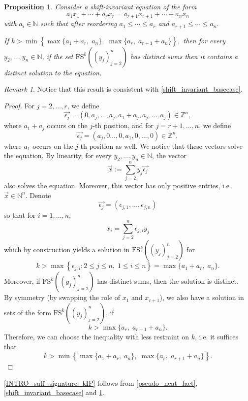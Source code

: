 \documentclass{article}
\theoremstyle{definition}
\theoremstyle{plain}
\newtheorem{proposition}[theorem]{Proposition}
\theoremstyle{remark}
\newtheorem{remark}{Remark}[section]
\newcommand{\N}{\ensuremath{\mathbb{N}}}
\newcommand{\Z}{\ensuremath{\mathbb{Z}}}
\newcommand{\FS}[2][]{\ensuremath{\mathrm{FS}^{#1}\left(#2\right)}}
\begin{document}
\begin{proposition}\label{sufficient_bound_shift_inv}
     Consider a shift-invariant equation of the form
     $$a_1 x_1 + \cdots + a_r x_r = a_{r+1} x_{r+1} + \cdots + a_n x_n$$
     with $a_i \in \N$ such that after reordering
     $a_1 \leq \cdots \leq a_r $ and $ a_{r+1} \leq \cdots \leq a_n.$

    If $k > \min \left \{ \max\{a_1 + a_r, \; a_n\},\; \max\{a_r,\; a_{r+1} + a_n\} \right \},$ then for every $y_2, \ldots ,y_n\in \N$, if the set $\FS[k]{(y_j)_{j=2}^n}$ has distinct sums then it contains a distinct solution to the equation.

\end{proposition}
\begin{remark}
    Notice that this result is consistent with \cref{shift_invariant_basecase}.
\end{remark}
\begin{proof}

    For $j=2,\ldots,r$, we define
    $$\Vec{\epsilon_j} = (0,a_j,\ldots, a_j, a_1 + a_j, a_j, \ldots, a_j) \in \Z^n,$$
    where $a_1+a_j$ occurs on the $j$-th position, and for $j=r+1,\ldots,n$, we define
    $$\Vec{\epsilon_j} = (a_j,0\ldots, 0, a_1 , 0, \ldots, 0) \in \Z^n,$$
    where $a_1$ occurs on the $j$-th position as well. We notice that these vectors solve the equation. By linearity, for every $y_2,\ldots,y_n \in \N$, the vector
    $$\Vec{x} := \sum_{j=2}^n y_j \Vec{\epsilon_j}$$
    also solves the equation. Moreover, this vector has only positive entries, i.e. $\Vec{x} \in \N^n$. Denote
    $$\Vec{\epsilon_j}= (\epsilon_{j,1}, \ldots, \epsilon_{j,n})$$
    so that for $i=1,\ldots,n$,
    $$x_i = \sum_{j=2}^n  \epsilon_{j,i} y_j$$
    which by construction yields a solution in $\FS[k]{(y_j)_{j=2}^n}$ for
    $$k > \max \left \{ \epsilon_{j,i}: 2 \leq j\leq n,\; 1 \leq i\leq n\right \}= \max\{a_1 + a_r, \; a_n\}.$$
    Moreover, if $\FS[k]{(y_j)_{j=2}^n}$ has distinct sums, then the solution is distinct.\\

    By symmetry (by swapping the role of $x_1$ and $x_{r+1}$), we also have a solution in sets of the form $\FS[k]{(y_j)_{j=2}^n }$, if 
    $$k > \max\{a_r,\; a_{r+1} + a_n\}.$$
    Therefore, we can choose the inequality with less restraint on $k$, i.e. it suffices that
    $$k > \min \left \{ \max\{a_1 + a_r, \; a_n\},\; \max\{a_r,\; a_{r+1} + a_n\} \right \}.$$
\end{proof}

\cref{INTRO_suff_signature_kIP} follows from \cref{pseudo_neat_fact}, \cref{shift_invariant_basecase} and \cref{sufficient_bound_shift_inv}. 



\end{document}
